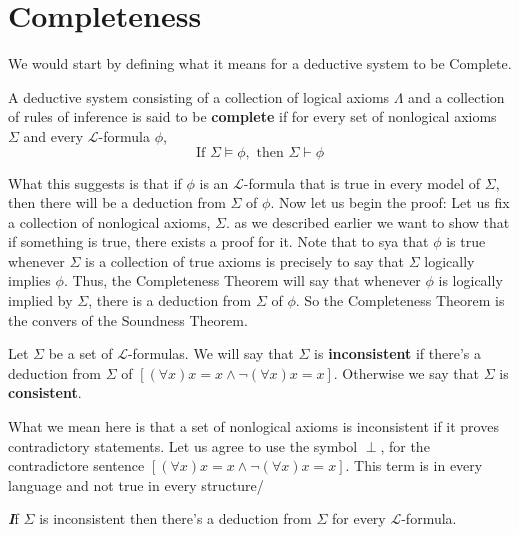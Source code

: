 \documentclass[9pt,a4paper]{article}
\newenvironment{callout}
	{\begin{calloutbox}\color{charcoal}\textbf\textit}
	{\end{calloutbox}}
\newcommand{\curveL}{\mathcal{L}}
\begin{document}
    \section*{Completeness}
        We would start by defining what it means for a deductive system to be Complete. 
        \begin{define}
            A deductive system consisting of a collection of logical axioms $\Lambda$ and a collection of rules of inference is said to be \textbf{complete} if for every set of nonlogical axioms $\Sigma$ and every $\curveL$-formula $\phi$, 
            \begin{equation}
                \text{If } \Sigma\vDash\phi, \text{ then } \Sigma\vdash\phi
            \end{equation}
        \end{define}
        What this suggests is that if $\phi$ is an $\curveL$-formula that is true in every model of $\Sigma$, then there will be a deduction from $\Sigma$ of $\phi$. Now let us begin the proof:
        Let us fix a collection of nonlogical axioms, $\Sigma$. as we described earlier we want to show that if something is true, there exists a proof for it. Note that to sya that $\phi$ is true whenever $\Sigma$ is a collection of true axioms is precisely to say that $\Sigma$ logically implies $\phi$. Thus, the Completeness Theorem will say that whenever $\phi$ is logically implied by $\Sigma$, there is a deduction from $\Sigma$ of $\phi$. So the Completeness Theorem is the convers of the Soundness Theorem. 
        \begin{define}
            Let $\Sigma$ be a set of $\curveL$-formulas. We will say that $\Sigma$ is \textbf{inconsistent} if there's a deduction from $\Sigma$ of $\left[(\forall x)x=x \land \neg(\forall x)x=x\right]$. Otherwise we say that $\Sigma$ is \textbf{consistent}.
        \end{define}
        What we mean here is that a set of nonlogical axioms is inconsistent if it proves contradictory statements. Let us agree to use the symbol $\perp$, for the contradictore sentence $\left[(\forall x)x=x \land \neg(\forall x)x=x\right]$. This term is in every language and not true in every structure/
        \begin{callout}
            If $\Sigma$ is inconsistent then there's a deduction from $\Sigma$ for every $\curveL$-formula.
        \end{callout}
\end{document}
